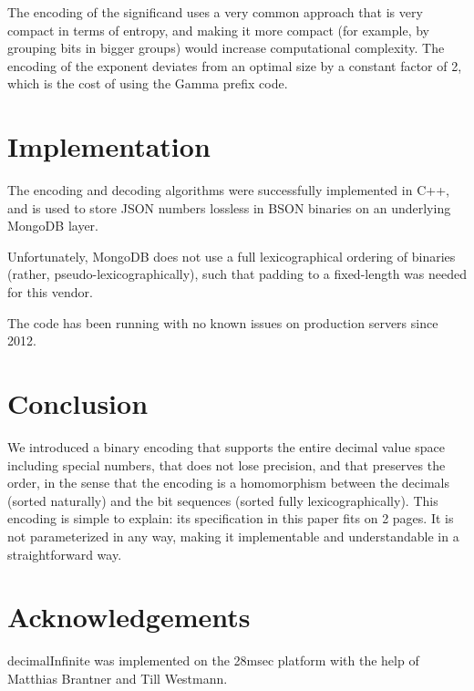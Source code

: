 \documentclass{acm_proc_article-sp}
\begin{document}
The encoding of the significand uses a very common approach that is very compact in terms of entropy, and making it more compact (for example, by grouping bits in bigger groups) would increase computational complexity. The encoding of the exponent deviates from an optimal size by a constant factor of 2, which is the cost of using the Gamma prefix code.

\section{Implementation}

The encoding and decoding algorithms were successfully implemented in C++, and is used to store JSON numbers lossless in BSON binaries on an underlying MongoDB layer.

Unfortunately, MongoDB does not use a full lexicographical ordering of binaries (rather, pseudo-lexicographically), such that padding to a fixed-length was needed for this vendor.

The code has been running with no known issues on production servers since 2012.

\section{Conclusion}

We introduced a binary encoding that supports the entire decimal value space including special numbers, that does not lose precision, and that preserves the order, in the sense that the encoding is a homomorphism between the decimals (sorted naturally) and the bit sequences (sorted fully lexicographically). This encoding is simple to explain: its specification in this paper fits on 2 pages. It is not parameterized in any way, making it implementable and understandable in a straightforward way.

\section{Acknowledgements}
decimalInfinite was implemented on the 28msec platform with the help of Matthias Brantner and Till Westmann.
\end{document}
